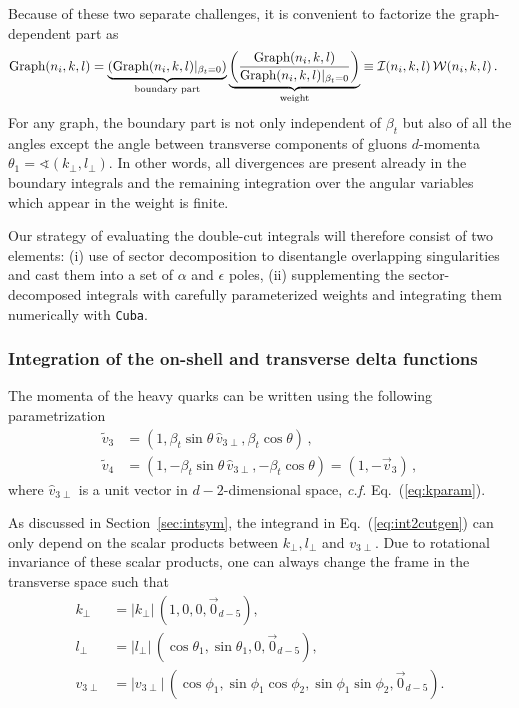 \documentclass[a4paper,11pt]{article}
\newcommand{\calI}{{\cal I}}
\newcommand{\calW}{{\cal W}}
\newcommand{\cf}{{\it c.f. }}
\newcommand{\gdp}{\text{Graph}(n_i, k, l)}
\numberwithin{equation}{section}
\begin{document}
Because of these two separate challenges, it is convenient to factorize the
graph-dependent part as
%
\begin{align}
  \gdp & = \underbrace{\left(\gdp\vert_{\beta_t=0}\right)}_\text{boundary part}
  \underbrace{\left(\frac{\gdp}{\gdp\vert_{\beta_t=0}}\right)}_\text{weight}
  \equiv \calI(n_i, k, l)\, \calW(n_i, k, l)\,.
\end{align}
%
For any graph, the boundary part is not only independent of $\beta_t$ but also
of all the angles except the angle between transverse components of gluons
$d$-momenta $\theta_1 = \sphericalangle(k_\perp, l_\perp)$. In other words, all
divergences are present already in the boundary integrals and the remaining
integration over the  angular variables which appear in the weight is finite.

Our strategy of evaluating the double-cut integrals will therefore consist of
two elements: (i) use of sector decomposition to disentangle overlapping
singularities and cast them into a set of $\alpha$ and $\epsilon$ poles, (ii)
supplementing the sector-decomposed integrals with carefully parameterized
weights and integrating them numerically with {\tt Cuba}.

\subsubsection{Integration of the on-shell and transverse delta functions}

The momenta of the heavy quarks can be written using the following
parametrization
%
\begin{align}
  \tilde v_3 & = (1, \beta_t \sin \theta\, \hat v_{3\perp}, \beta_t \cos \theta)\,, \\
  \tilde v_4 & = (1, -\beta_t \sin \theta\, \hat v_{3\perp}, -\beta_t \cos \theta) 
               = (1,-\vec v_3)\,,
\end{align}
where $\hat v_{3\perp}$ is a unit vector in $d-2$-dimensional space, \cf
Eq.~(\ref{eq:kparam}).

As discussed in Section~\ref{sec:intsym}, the integrand in
Eq.~(\ref{eq:int2cutgen}) can only depend on the scalar products between
$k_\perp,l_\perp$ and $v_{3\perp}$. Due to rotational invariance of these 
scalar products, one can always change the frame in the transverse space such
that
%
\begin{subequations}
  \begin{align}
    k_\perp & = |k_\perp|\, (1,0, 0, \vec{0}_{d-5}),\\
    l_\perp & = |l_\perp|\, (\cos\theta_1,\sin\theta_1 , 0, \vec{0}_{d-5}),
    \label{eq:theta1} \\
    v_{3\perp} & = |v_{3\perp}|\, (\cos\phi_1,\sin\phi_1\cos\phi_2, 
                         \sin\phi_1\sin\phi_2,\vec{0}_{d-5}).
  \end{align}
  \label{eq:klv3param}
\end{subequations}
\end{document}
